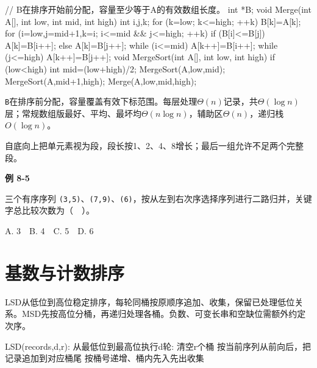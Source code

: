 \par\smallskip\noindent\begin{minipage}{\linewidth}
\begin{codeblock}[language={C++}]
// B在排序开始前分配，容量至少等于A的有效数组长度。
int *B;
void Merge(int A[], int low, int mid, int high) {
    int i,j,k;
    for (k=low; k<=high; ++k) B[k]=A[k];
    for (i=low,j=mid+1,k=i; i<=mid && j<=high; ++k)
        if (B[i]<=B[j]) A[k]=B[i++];
        else A[k]=B[j++];
    while (i<=mid) A[k++]=B[i++];
    while (j<=high) A[k++]=B[j++];
}
void MergeSort(int A[], int low, int high) {
    if (low<high) {
        int mid=(low+high)/2;
        MergeSort(A,low,mid);
        MergeSort(A,mid+1,high);
        Merge(A,low,mid,high);
    }
}
\end{codeblock}
\end{minipage}\par\smallskip

\texttt{B}在排序前分配，容量覆盖有效下标范围。每层处理\(\Theta(n)\)记录，共\(\Theta(\log n)\)层；常规数组版最好、平均、最坏均\(\Theta(n\log n)\)，辅助区\(\Theta(n)\)，递归栈\(O(\log n)\)。

自底向上把单元素视为段，段长按1、2、4、8增长；最后一组允许不足两个完整段。

\par\medskip{}\noindent\hypertarget{DS08-E04}{}\label{DS08-E04}\textbf{例 8-5}\par\nobreak\smallskip

三个有序序列 \texttt{(\allowbreak{}3,\allowbreak{}5)\allowbreak{}}、\texttt{(\allowbreak{}7,\allowbreak{}9)\allowbreak{}}、\texttt{(\allowbreak{}6)\allowbreak{}}，按从左到右次序选择序列进行二路归并，关键字总比较次数为（　）。

A. 3　B. 4　C. 5　D. 6

\section{基数与计数排序}\label{DS08-distribution}

LSD从低位到高位稳定排序，每轮同桶按原顺序追加、收集，保留已处理低位关系。MSD先按高位分桶，再递归处理各桶。负数、可变长串和空缺位需额外约定次序。

\par\smallskip\noindent\begin{minipage}{\linewidth}
\begin{codeblock}[language={}]
LSD(records,d,r):
    从最低位到最高位执行d轮:
        清空r个桶
        按当前序列从前向后，把记录追加到对应桶尾
        按桶号递增、桶内先入先出收集
\end{codeblock}
\end{minipage}\par\smallskip


